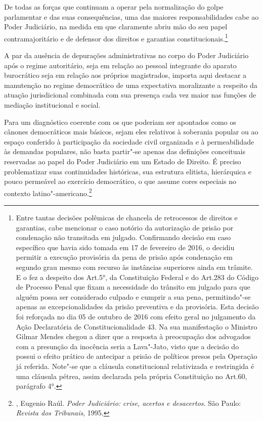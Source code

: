 De todas as forças que continuam a operar pela normalização do golpe
parlamentar e das suas consequências, uma das maiores responsabilidades
cabe ao Poder Judiciário, na medida em que claramente abriu mão do seu
papel contramajoritário e de defensor dos direitos e garantias
constitucionais.\footnote{Entre tantas decisões polêmicas de chancela de
  retrocessos de direitos e garantias, cabe mencionar o caso notório da
  autorização de prisão por condenação não transitada em julgado.
  Confirmando decisão em caso específico que havia sido tomada em 17 de
  fevereiro de 2016, o  decidiu permitir a execução provisória da
  pena de prisão após condenação em segundo grau mesmo com recurso às
  instâncias superiores ainda em trâmite. E o fez a despeito dos Art.5°,
   da Constituição Federal e do Art.283 do Código de Processo Penal
  que fixam a necessidade do trânsito em julgado para que alguém possa
  ser considerado culpado e cumprir a sua pena, permitindo"-se apenas as
  excepcionalidades da prisão preventiva e da provisória. Esta decisão
  foi reforçada no dia 05 de outubro de 2016 com efeito geral no
  julgamento da Ação Declaratória de Constitucionalidade 43. Na sua
  manifestação o Ministro Gilmar Mendes chegou a dizer que a resposta à
  preocupação dos advogados com a presunção da inocência seria a
  Lava"-Jato, visto que a decisão do  possui o efeito prático de
  antecipar a prisão de políticos presos pela Operação já referida.
  Note"-se que a cláusula constitucional relativizada e restringida é uma
  cláusula pétrea, assim declarada pela própria Constituição no Art.60,
  parágrafo 4°.}

A par da ausência de depurações administrativas no corpo do Poder
Judiciário após o regime autoritário, seja em relação ao pessoal
integrante do aparato burocrático seja em relação aos próprios
magistrados, importa aqui destacar a manutenção no regime democrático de
uma expectativa moralizante a respeito da atuação jurisdicional
combinada com sua presença cada vez maior nas funções de mediação
institucional e social.

Para um diagnóstico coerente com os que poderiam ser apontados como os
cânones democráticos mais básicos, sejam eles relativos à soberania
popular ou ao espaço conferido à participação da sociedade civil
organizada e à permeabilidade às demandas populares, não basta partir"-se
apenas das definições conceituais reservadas ao papel do Poder
Judiciário em um Estado de Direito. É preciso problematizar suas
continuidades históricas, sua estrutura elitista, hierárquica e pouco
permeável ao exercício democrático, o que assume cores especiais no
contexto latino"-americano.\footnote{, Eugenio Raúl.
  \emph{Poder Judiciário: crise, acertos e desacertos}. São Paulo:
  \emph{Revista dos Tribunais}, 1995.}

